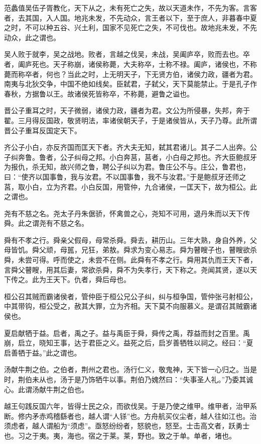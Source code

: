 \documentclass[12pt,UTF8]{ctexbook}
\begin{document}
范蠡值吴伍子胥教化，天下从之，未有死亡之失，故以天道未作，不先为客。言客者，去其国，入人国。地兆未发，不先动众，言王者以下，至于庶人，非暮春中夏之时，不可以种五谷、兴土利，国家不见死亡之失，不可伐也。故地兆未发，不先动众，此之谓也。

吴人败于就李，吴之战地。败者，言越之伐吴，未战，吴阖庐卒，败而去也。卒者，阖庐死也。天子称崩，诸侯称薨，大夫称卒，士称不禄。阖庐，诸侯也，不称薨而称卒者，何也？当此之时，上无明天子，下无贤方伯，诸侯力政，疆者为君。南夷与北狄交争，中国不绝如线矣。臣弑君，子弑父，天下莫能禁止。于是孔子作春秋，方据鲁以王。故诸侯死皆称卒，不称薨，避鲁之谥也。

晋公子重耳之时，天子微弱，诸侯力政，疆者为君。文公为所侵暴，失邦，奔于翟。三月得反国政，敬贤明法，率诸侯朝天子，于是诸侯皆从，天子乃尊。此所谓晋公子重耳反国定天下。

齐公子小白，亦反齐国而匡天下者。齐大夫无知，弑其君诸儿。其子二人出奔。公子纠奔鲁。鲁者，公子纠母之邦。小白奔莒，莒者，小白母之邦也。齐大臣鲍叔牙为报仇，杀无知，故兴师之鲁，聘公子纠以为君。鲁庄公不与。庄公，鲁君也，曰：“使齐以国事鲁，我与汝君。不以国事鲁，我不与汝君。”于是鲍叔牙还师之莒，取小白，立为齐君。小白反国，用管仲，九合诸侯，一匡天下，故为桓公。此之谓也。

尧有不慈之名。尧太子丹朱倨骄，怀禽兽之心，尧知不可用，退丹朱而以天下传舜。此之谓尧有不慈之名。

舜有不孝之行。舜亲父假母，母常杀舜。舜去，耕历山。三年大熟，身自外养，父母皆饥。舜父顽，母嚚，兄狂，弟敖。舜求为变心易志。舜为瞽瞍子也，瞽瞍欲杀舜，未尝可得。呼而使之，未尝不在侧。此舜有不孝之行。舜用其仇而王天下者，言舜父瞽瞍，用其后妻，常欲杀舜，舜不为失孝行，天下称之。尧闻其贤，遂以天下传之。此为王天下。仇者，舜后母也。

桓公召其贼而霸诸侯者，管仲臣于桓公兄公子纠，纠与桓争国，管仲张弓射桓公，中其带钩，桓公受之，赦其大罪，立为齐相。天下莫不向服慕义。是谓召其贼霸诸侯也。

夏启献牺于益。启者，禹之子。益与禹臣于舜，舜传之禹，荐益而封之百里。禹崩，启立，晓知王事，达于君臣之义。益死之后，启岁善牺牲以祠之。经曰：“夏启善牺于益。”此之谓也。

汤献牛荆之伯。之伯者，荆州之君也。汤行仁义，敬鬼神，天下皆一心归之。当是时，荆伯未从也，汤于是乃饰牺牛以事。荆伯乃媿然曰：“失事圣人礼。”乃委其诚心。此谓汤献牛荆之伯也。

越王句践反国六年，皆得士民之众，而欲伐吴。于是乃使之维甲。维甲者，治甲系断。修内矛赤鸡稽繇者也，越人谓“人铩”也。方舟航买仪尘者，越人往如江也。治须虑者，越人谓船为“须虑”。亟怒纷纷者，怒貌也，怒至。士击高文者，跃勇士也。习之于夷。夷，海也。宿之于莱。莱，野也。致之于单。单者，堵也。
\end{document}
